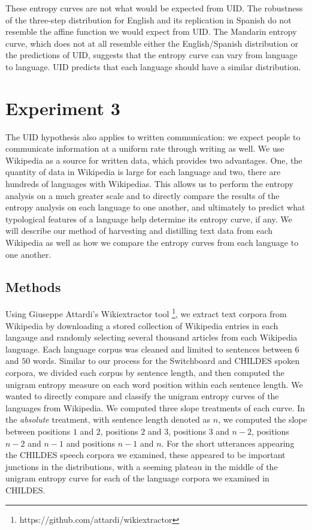 \documentclass[10pt, letterpaper]{article}
\begin{document}
These entropy curves are not what would be expected from UID. The
robustness of the three-step distribution for English and its
replication in Spanish do not resemble the affine function we would
expect from UID. The Mandarin entropy curve, which does not at all
resemble either the English/Spanish distribution or the predictions of
UID, suggests that the entropy curve can vary from language to language.
UID predicts that each language should have a similar distribution.

\section{Experiment 3}\label{experiment-3}

The UID hypothesis also applies to written communication: we expect
people to communicate information at a uniform rate through writing as
well. We use Wikipedia as a source for written data, which provides two
advantages. One, the quantity of data in Wikipedia is large for each
language and two, there are hundreds of languages with Wikipedias. This
allows us to perform the entropy analysis on a much greater scale and to
directly compare the results of the entropy analysis on each language to
one another, and ultimately to predict what typological features of a
language help determine its entropy curve, if any. We will describe our
method of harvesting and distilling text data from each Wikipedia as
well as how we compare the entropy curves from each language to one
another.

\subsection{Methods}\label{methods}

Using Giuseppe Attardi's Wikiextractor tool
\footnote{https://github.com/attardi/wikiextractor}, we extract text
corpora from Wikipedia by downloading a stored collection of Wikipedia
entries in each langauge and randomly selecting several thousand
articles from each Wikipedia language. Each language corpus was cleaned
and limited to sentences between \(6\) and \(50\) words. Similar to our
process for the Switchboard and CHILDES spoken corpora, we divided each
corpus by sentence length, and then computed the unigram entropy measure
on each word position within each sentence length. We wanted to directly
compare and classify the unigram entropy curves of the languages from
Wikipedia. We computed three slope treatments of each curve. In the
\emph{absolute} treatment, with sentence length denoted as \(n\), we
computed the slope between positions \(1\) and \(2\), positions \(2\)
and \(3\), positions \(3\) and \(n-2\), positions \(n-2\) and \(n-1\)
and positions \(n-1\) and \(n\). For the short utterances appearing the
CHILDES speech corpora we examined, these appeared to be important
junctions in the distributions, with a seeming plateau in the middle of
the unigram entropy curve for each of the language corpora we examined
in CHILDES.
\end{document}
